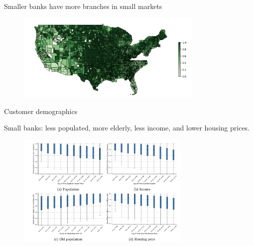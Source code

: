 \documentclass[notes,10pt, aspectratio=169]{beamer}
\newenvironment{wideitemize}{\itemize\addtolength{\itemsep}{10pt}}{\enditemize}
\begin{document}
\begin{frame}{Smaller banks have more branches in small markets}

    \begin{figure}
    \centering
    \includegraphics[width=0.8\textwidth]{imgs/fig4.png}
    \end{figure}
    
\end{frame}

\begin{frame}{Customer demographics}
    
        \begin{wideitemize}
            \item Small banks: less populated, more elderly, less income, and lower housing prices.
    \end{wideitemize}
    
    \begin{figure}
    \centering
    \includegraphics[width=0.74\textwidth]{imgs/fig5.png}
    \end{figure}
    
\end{frame}
\end{document}
